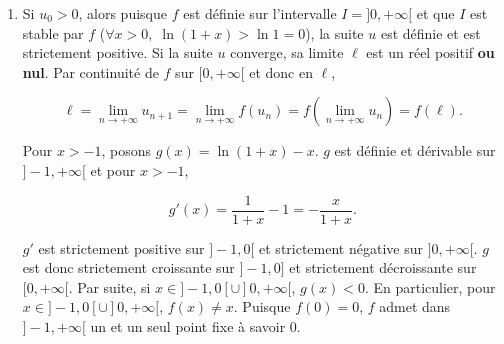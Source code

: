 \documentclass[11pt,a4paper]{article}
\newcommand{\Nn}{\mathbb{N}} \newcommand{\N}{\mathbb{N}}
\begin{document}
\begin{enumerate}
On en déduit que, si $x\in[-1,\alpha[$, $f(x)>x$, et si $x\in]\alpha,+\infty[$, $f(x)<x$. Mais alors, 
si $-1\leq u_0<\alpha$, puisque $\forall n\in\Nn,\;-1\leq u_n<\alpha$, pour $n$ entier naturel donné, on a

$$u_{n+1}=f(u_n)>u_n.$$

La suite $u$ est donc strictement croissante, majorée par $\alpha$ et donc convergente. On sait de plus que sa limite est nécessairement $\alpha$.

Si $u_0>\alpha$, puisque $\forall n\in\Nn,\;u_n>\alpha$, pour $n$ entier naturel donné, on a

$$u_{n+1}=f(u_n)<u_n.$$

La suite $u$ est donc strictement décroissante, minorée par $\alpha$ et donc convergente. On sait de plus que sa limite est nécessairement $\alpha$. Enfin, si $u_0=\alpha$, la suite $u$ est constante.

En résumé,

si $u_0\in[-1,\frac{\sqrt{5}+1}{2}[$, la suite $u$ est strictement croissante, convergente de limite $\frac{\sqrt{5}+1}{2}[$,

si $u_0\in]\frac{\sqrt{5}+1}{2},+\infty[$, la suite $u$ est strictement décroissante, convergente de limite $\frac{\sqrt{5}+1}{2}[$,

si $u_0=\frac{\sqrt{5}+1}{2}[$, la suite $u$ est constante et en particulier convergente de limite $\frac{\sqrt{5}+1}{2}$.

Ainsi, dans tous les cas, la suite $u$ est convergente et $\lim_{n\rightarrow +\infty}u_n=\frac{1+\sqrt{5}}{2}$.



\item  Si $u_0>0$, alors puisque $f$ est définie sur l'intervalle $I=]0,+\infty[$ et que $I$ est stable par $f$ ($\forall x>0,\;\ln(1+x)>\ln1=0$), la suite $u$ est définie et est strictement positive. Si la suite $u$ converge, sa limite $\ell$ est un réel positif \textbf{ou nul}. Par continuité de $f$ sur $[0,+\infty[$ et donc en $\ell$,

$$\ell=\lim_{n\rightarrow +\infty}u_{n+1}=\lim_{n\rightarrow +\infty}f(u_n)=f(\lim_{n\rightarrow +\infty}u_n)=f(\ell).$$

Pour $x>-1$, posons $g(x)=\ln(1+x)-x$. $g$ est définie et dérivable sur $]-1,+\infty[$ et pour $x>-1$,

$$g'(x)=\frac{1}{1+x}-1=-\frac{x}{1+x}.$$

$g'$ est strictement positive sur $]-1,0[$ et strictement négative sur $]0,+\infty[$. $g$ est donc strictement croissante sur $]-1,0]$ et strictement décroissante sur $[0,+\infty[$. Par suite, si $x\in]-1,0[\cup]0,+\infty[$, $g(x)<0$. En particulier, pour $x\in]-1,0[\cup]0,+\infty[$, $f(x)\neq x$. Puisque $f(0)=0$, $f$ admet dans $]-1,+\infty[$ un et un seul point fixe à savoir $0$.


\end{enumerate}
\end{document}
